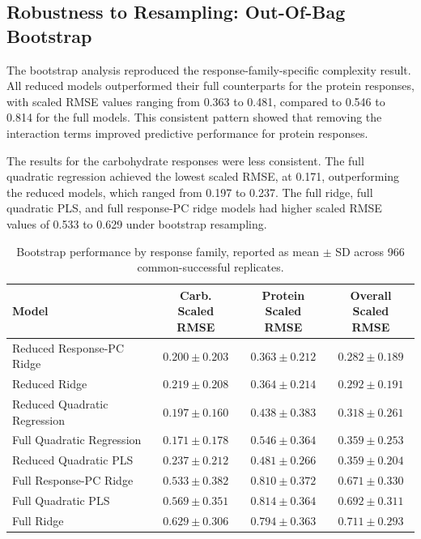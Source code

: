\documentclass[MScDSA]{uccthesis}
\begin{document}
\subsection{Robustness to Resampling: Out-Of-Bag Bootstrap}
\label{sec:oob_bootstrap}
The bootstrap analysis reproduced the response-family-specific complexity result. All reduced models outperformed their full counterparts for the protein responses, with scaled RMSE values ranging from 0.363 to 0.481, compared to 0.546 to 0.814 for the full models. This consistent pattern showed that removing the interaction terms improved predictive performance for protein responses.

The results for the carbohydrate responses were less consistent. The full quadratic regression achieved the lowest scaled RMSE, at 0.171, outperforming the reduced models, which ranged from 0.197 to 0.237. The full ridge, full quadratic PLS, and full response-PC ridge models had higher scaled RMSE values of 0.533 to 0.629 under bootstrap resampling.

\begin{table}[H]
\centering
\fontsize{10}{12}\selectfont
\setlength{\tabcolsep}{4pt}
\caption{Bootstrap performance by response family, reported as mean $\pm$ SD across 966 common-successful replicates.}
\label{tab:bootstrap_response_family}
\begin{tabular}{lccc}
\toprule
\textbf{Model} & \makecell{\textbf{Carb.}\\\textbf{Scaled RMSE}} & \makecell{\textbf{Protein}\\\textbf{Scaled RMSE}} & \makecell{\textbf{Overall}\\\textbf{Scaled RMSE}} \\
\midrule
Reduced Response-PC Ridge & $0.200 \pm 0.203$ & $0.363 \pm 0.212$ & $0.282 \pm 0.189$ \\
Reduced Ridge & $0.219 \pm 0.208$ & $0.364 \pm 0.214$ & $0.292 \pm 0.191$ \\
Reduced Quadratic Regression & $0.197 \pm 0.160$ & $0.438 \pm 0.383$ & $0.318 \pm 0.261$ \\
Full Quadratic Regression & $0.171 \pm 0.178$ & $0.546 \pm 0.364$ & $0.359 \pm 0.253$ \\
Reduced Quadratic PLS & $0.237 \pm 0.212$ & $0.481 \pm 0.266$ & $0.359 \pm 0.204$ \\
Full Response-PC Ridge & $0.533 \pm 0.382$ & $0.810 \pm 0.372$ & $0.671 \pm 0.330$ \\
Full Quadratic PLS & $0.569 \pm 0.351$ & $0.814 \pm 0.364$ & $0.692 \pm 0.311$ \\
Full Ridge & $0.629 \pm 0.306$ & $0.794 \pm 0.363$ & $0.711 \pm 0.293$ \\
\bottomrule
\end{tabular}
\end{table}
\end{document}
